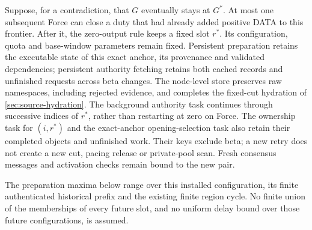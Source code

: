 Suppose, for a contradiction, that $G$ eventually stays at $G^*$.
At most one subsequent Force can close a duty that had already added
positive DATA to this frontier. After it, the zero-output rule keeps a
fixed slot $r^*$. Its configuration, quota and base-window parameters
remain fixed. Persistent preparation retains the executable state of
this exact anchor, its provenance and validated dependencies; persistent
authority fetching retains both cached records and unfinished requests
across beta changes. The node-level store preserves raw namespaces,
including rejected evidence, and completes the fixed-cut hydration of
\cref{sec:source-hydration}. The background authority task continues through
successive indices of $r^*$, rather than restarting at zero on Force.
The ownership task for $(i,r^*)$ and the exact-anchor opening-selection
task also retain their completed objects and unfinished work. Their keys
exclude beta; a new retry does not create a new cut, pacing release or
private-pool scan. Fresh consensus messages and activation checks remain
bound to the new pair.

The preparation maxima below range over this installed configuration,
its finite authenticated historical prefix and the existing finite region
cycle. No finite union of the memberships of every future slot, and no
uniform delay bound over those future configurations, is assumed.

